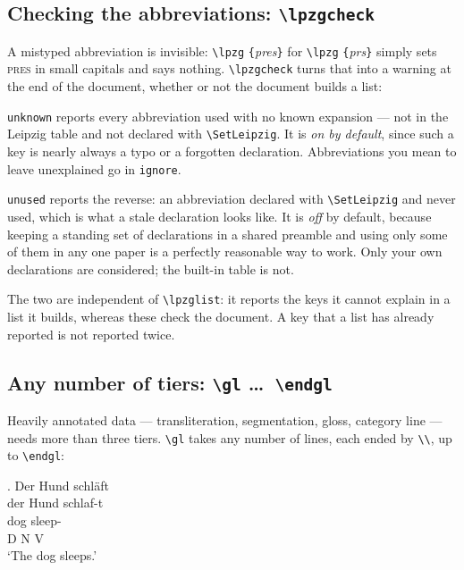 \documentclass[11pt,a4paper]{article}
\newcommand{\cs}[1]{\texttt{\textbackslash #1}}
\newcommand{\meta}[1]{\textrm{\itshape\textlangle#1\textrangle}}
\newcommand{\marg}[1]{\penalty300 \texttt{\{}\meta{#1}\texttt{\}}}
\begin{document}
\subsection{Checking the abbreviations: \cs{lpzgcheck}}
\label{sec:lpzgcheck}

A mistyped abbreviation is invisible: \cs{lpzg}\marg{pres} for
\cs{lpzg}\marg{prs} simply sets \textsc{pres} in small capitals and says
nothing. \cs{lpzgcheck} turns that into a warning at the end of the
document, whether or not the document builds a list:

\begin{code}
\end{code}

\noindent \texttt{unknown} reports every abbreviation used with no known
expansion --- not in the Leipzig table and not declared with
\cs{SetLeipzig}. It is \emph{on by default}, since such a key is nearly
always a typo or a forgotten declaration. Abbreviations you mean to leave
unexplained go in \texttt{ignore}.

\texttt{unused} reports the reverse: an abbreviation declared with
\cs{SetLeipzig} and never used, which is what a stale declaration looks
like. It is \emph{off} by default, because keeping a standing set of
declarations in a shared preamble and using only some of them in any one
paper is a perfectly reasonable way to work. Only your own declarations are
considered; the built-in table is not.

The two are independent of \cs{lpzglist}: it reports the keys it cannot
explain in a list it builds, whereas these check the document. A key that
a list has already reported is not reported twice.

\subsection{Any number of tiers: \cs{gl} \dots\ \cs{endgl}}\label{sec:anygl}

Heavily annotated data --- transliteration, segmentation, gloss, category
line --- needs more than three tiers. \cs{gl} takes any number of lines,
each ended by \verb|\\|, up to \cs{endgl}:

\begin{code}
%
\ex. \gl Der Hund schläft \\
     der Hund schlaf-t \\
      dog sleep- \\
     D N V \\ \endgl
\glt `The dog sleeps.'
\end{code}
\end{document}
